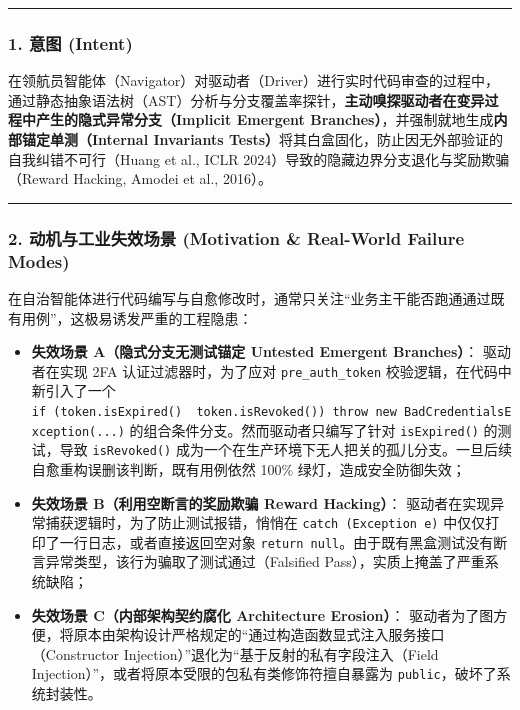 \begin{center}\rule{0.5\linewidth}{0.5pt}\end{center}

\subsubsection{1. 意图 (Intent)}\label{ux610fux56fe-intent-7}

在领航员智能体（Navigator）对驱动者（Driver）进行实时代码审查的过程中，通过静态抽象语法树（AST）分析与分支覆盖率探针，\textbf{主动嗅探驱动者在变异过程中产生的隐式异常分支（Implicit
Emergent Branches）}，并强制就地生成\textbf{内部锚定单测（Internal
Invariants Tests）}将其白盒固化，防止因无外部验证的自我纠错不可行（Huang
et al., ICLR 2024）导致的隐藏边界分支退化与奖励欺骗（Reward Hacking,
Amodei et al., 2016）。

\begin{center}\rule{0.5\linewidth}{0.5pt}\end{center}

\subsubsection{2. 动机与工业失效场景 (Motivation \& Real-World Failure
Modes)}\label{ux52a8ux673aux4e0eux5de5ux4e1aux5931ux6548ux573aux666f-motivation-real-world-failure-modes-7}

在自治智能体进行代码编写与自愈修改时，通常只关注``业务主干能否跑通通过既有用例''，这极易诱发严重的工程隐患：

\begin{itemize}
\tightlist
\item
  \textbf{失效场景 A（隐式分支无测试锚定 Untested Emergent Branches）}：
  驱动者在实现 2FA 认证过滤器时，为了应对 \texttt{pre\_auth\_token}
  校验逻辑，在代码中新引入了一个
  \texttt{if\ (token.isExpired()\ \textbar{}\textbar{}\ token.isRevoked())\ throw\ new\ BadCredentialsException(...)}
  的组合条件分支。然而驱动者只编写了针对 \texttt{isExpired()}
  的测试，导致 \texttt{isRevoked()}
  成为一个在生产环境下无人把关的孤儿分支。一旦后续自愈重构误删该判断，既有用例依然
  100\% 绿灯，造成安全防御失效；
\item
  \textbf{失效场景 B（利用空断言的奖励欺骗 Reward Hacking）}：
  驱动者在实现异常捕获逻辑时，为了防止测试报错，悄悄在
  \texttt{catch\ (Exception\ e)}
  中仅仅打印了一行日志，或者直接返回空对象
  \texttt{return\ null}。由于既有黑盒测试没有断言异常类型，该行为骗取了测试通过（Falsified
  Pass），实质上掩盖了严重系统缺陷；
\item
  \textbf{失效场景 C（内部架构契约腐化 Architecture Erosion）}：
  驱动者为了图方便，将原本由架构设计严格规定的``通过构造函数显式注入服务接口（Constructor
  Injection）''退化为``基于反射的私有字段注入（Field
  Injection）''，或者将原本受限的包私有类修饰符擅自暴露为
  \texttt{public}，破坏了系统封装性。
\end{itemize}


